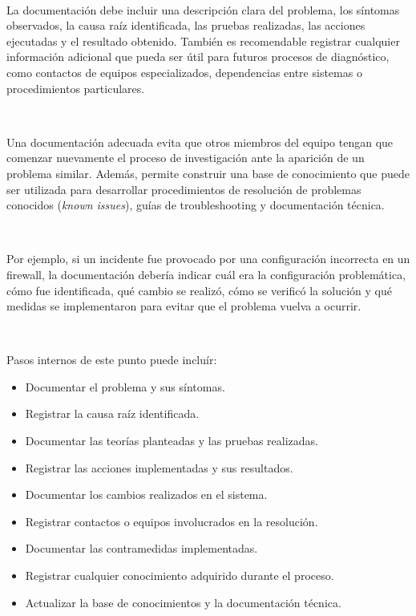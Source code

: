\documentclass[a4paper,10pt]{article}
\begin{document}
\

La documentación debe incluir una descripción clara del problema, los síntomas observados, 
la causa raíz identificada, las pruebas realizadas, las acciones ejecutadas y el resultado obtenido. 
También es recomendable registrar cualquier información adicional que pueda ser útil para futuros procesos de diagnóstico, como contactos de equipos especializados, dependencias entre sistemas o procedimientos particulares.

\

Una documentación adecuada evita que otros miembros del equipo tengan que comenzar nuevamente el proceso de investigación ante la aparición de un problema similar. 
Además, permite construir una base de conocimiento que puede ser utilizada para desarrollar procedimientos de resolución de problemas conocidos (\textit{known issues}), guías de troubleshooting y documentación técnica.

\

Por ejemplo, si un incidente fue provocado por una configuración incorrecta en un firewall, la documentación debería indicar cuál era la configuración problemática, 
cómo fue identificada, qué cambio se realizó, cómo se verificó la solución y qué medidas se implementaron para evitar que el problema vuelva a ocurrir.

\

Pasos internos de este punto puede incluír:

\begin{itemize}
    \item Documentar el problema y sus síntomas.
    \item Registrar la causa raíz identificada.
    \item Documentar las teorías planteadas y las pruebas realizadas.
    \item Registrar las acciones implementadas y sus resultados.
    \item Documentar los cambios realizados en el sistema.
    \item Registrar contactos o equipos involucrados en la resolución.
    \item Documentar las contramedidas implementadas.
    \item Registrar cualquier conocimiento adquirido durante el proceso.
    \item Actualizar la base de conocimientos y la documentación técnica.
\end{itemize}
\end{document}
